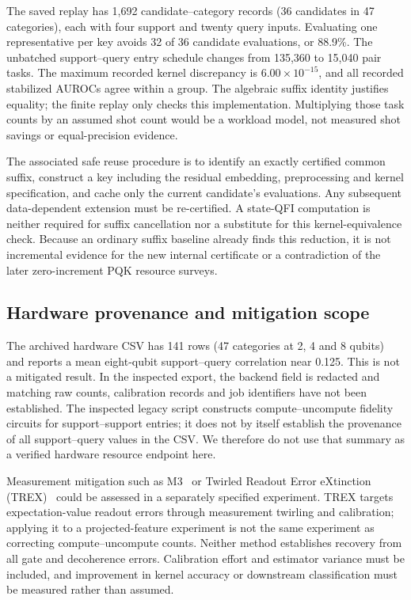 The saved replay has 1,692 candidate--category records (36 candidates
in 47 categories), each with four support and twenty query inputs.
Evaluating one representative per key avoids 32 of 36 candidate
evaluations, or 88.9\%. The unbatched support--query entry schedule
changes from 135,360 to 15,040 pair tasks. The maximum recorded
kernel discrepancy is $6.00\times10^{-15}$, and all recorded
stabilized AUROCs agree within a group. The algebraic suffix identity
justifies equality; the finite replay only checks this implementation.
Multiplying those task counts by an assumed shot count would be a
workload model, not measured shot savings or equal-precision evidence.

The associated safe reuse procedure is to identify an exactly
certified common suffix, construct a key including the residual
embedding, preprocessing and kernel specification, and cache only
the current candidate's evaluations. Any subsequent data-dependent
extension must be re-certified. A state-QFI computation is neither
required for suffix cancellation nor a substitute for this
kernel-equivalence check. Because an ordinary suffix baseline already
finds this reduction, it is not incremental evidence for the new
internal certificate or a contradiction of the later zero-increment
PQK resource surveys.

\subsection{Hardware provenance and mitigation scope}
The archived hardware CSV has 141 rows (47 categories at 2, 4 and
8 qubits) and reports a mean eight-qubit support--query correlation
near 0.125. This is not a mitigated result. In the inspected export,
the backend field is redacted and matching raw counts, calibration
records and job identifiers have not been established. The inspected
legacy script constructs compute--uncompute fidelity circuits for
support--support entries; it does not by itself establish the
provenance of all support--query values in the CSV. We therefore do
not use that summary as a verified hardware resource endpoint here.

Measurement mitigation such as M3~\cite{m3} or Twirled Readout Error
eXtinction (TREX)~\cite{ibmtrex} could be assessed in a separately
specified experiment. TREX targets expectation-value readout errors
through measurement twirling and calibration; applying it to a
projected-feature experiment is not the same experiment as correcting
compute--uncompute counts. Neither method establishes recovery from
all gate and decoherence errors. Calibration effort and estimator
variance must be included, and improvement in kernel accuracy or
downstream classification must be measured rather than assumed.
